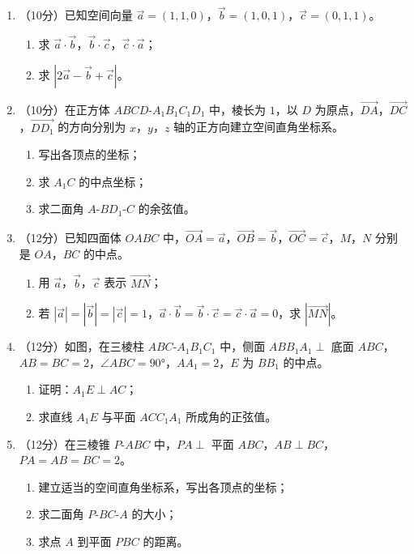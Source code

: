 \documentclass[12pt, a4paper]{ctexart}
\begin{document}
\begin{enumerate}[resume]
\item （10分）已知空间向量 $\vec{a}=(1,1,0)$，$\vec{b}=(1,0,1)$，$\vec{c}=(0,1,1)$。
\begin{enumerate}[label=(\arabic*)]
\item 求 $\vec{a}\cdot\vec{b}$，$\vec{b}\cdot\vec{c}$，$\vec{c}\cdot\vec{a}$；
\item 求 $|2\vec{a}-\vec{b}+\vec{c}|$。
\end{enumerate}

\item （10分）在正方体 $ABCD\text{-}A_1B_1C_1D_1$ 中，棱长为 $1$，以 $D$ 为原点，$\overrightarrow{DA}$，$\overrightarrow{DC}$，$\overrightarrow{DD_1}$ 的方向分别为 $x$，$y$，$z$ 轴的正方向建立空间直角坐标系。
\begin{enumerate}[label=(\arabic*)]
\item 写出各顶点的坐标；
\item 求 $A_1C$ 的中点坐标；
\item 求二面角 $A\text{-}BD_1\text{-}C$ 的余弦值。
\end{enumerate}

\item （12分）已知四面体 $OABC$ 中，$\overrightarrow{OA}=\vec{a}$，$\overrightarrow{OB}=\vec{b}$，$\overrightarrow{OC}=\vec{c}$，$M$，$N$ 分别是 $OA$，$BC$ 的中点。
\begin{enumerate}[label=(\arabic*)]
\item 用 $\vec{a}$，$\vec{b}$，$\vec{c}$ 表示 $\overrightarrow{MN}$；
\item 若 $|\vec{a}|=|\vec{b}|=|\vec{c}|=1$，$\vec{a}\cdot\vec{b}=\vec{b}\cdot\vec{c}=\vec{c}\cdot\vec{a}=0$，求 $|\overrightarrow{MN}|$。
\end{enumerate}

\item （12分）如图，在三棱柱 $ABC\text{-}A_1B_1C_1$ 中，侧面 $ABB_1A_1\perp$ 底面 $ABC$，$AB=BC=2$，$\angle ABC=90°$，$AA_1=2$，$E$ 为 $BB_1$ 的中点。
\begin{enumerate}[label=(\arabic*)]
\item 证明：$A_1E\perp AC$；
\item 求直线 $A_1E$ 与平面 $ACC_1A_1$ 所成角的正弦值。
\end{enumerate}

\item （12分）在三棱锥 $P\text{-}ABC$ 中，$PA\perp$ 平面 $ABC$，$AB\perp BC$，$PA=AB=BC=2$。
\begin{enumerate}[label=(\arabic*)]
\item 建立适当的空间直角坐标系，写出各顶点的坐标；
\item 求二面角 $P\text{-}BC\text{-}A$ 的大小；
\item 求点 $A$ 到平面 $PBC$ 的距离。
\end{enumerate}


\end{enumerate}
\end{document}
